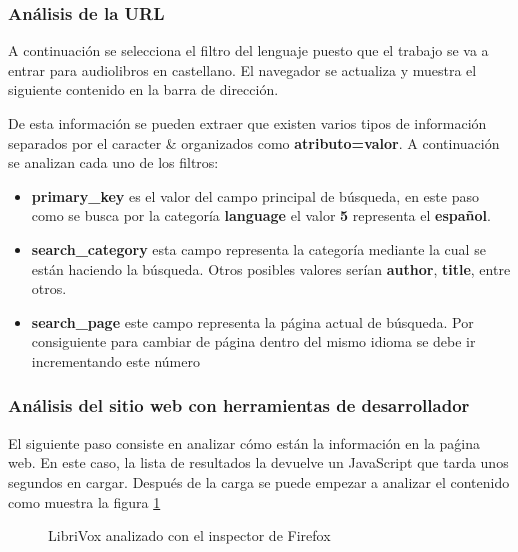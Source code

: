 \subsubsection{Análisis de la \acrshort{URL}}
A continuación se selecciona el filtro del lenguaje puesto que el trabajo se va a entrar para audiolibros en castellano. El navegador se actualiza y muestra el siguiente contenido en la barra de dirección.
\begin{center}
\end{center}
De esta información se pueden extraer que existen varios tipos de información separados por el caracter \& organizados como \textbf{atributo=valor}. A continuación se analizan cada uno de los filtros:
\begin{itemize}
	\item \textbf{primary\_key} es el valor del campo principal de búsqueda, en este paso como se busca por la categoría \textbf{language} el valor \textbf{5} representa el \textbf{español}.
	\item \textbf{search\_category} esta campo representa la categoría mediante la cual se están haciendo la búsqueda. Otros posibles valores serían \textbf{author}, \textbf{title}, entre otros.
	\item \textbf{search\_page} este campo representa la página actual de búsqueda. Por consiguiente para cambiar de página dentro del mismo idioma se debe ir incrementando este número
\end{itemize}
\subsubsection{Análisis del sitio web con herramientas de desarrollador}
El siguiente paso consiste en analizar cómo están la información en la paǵina web. En este caso, la lista de resultados la devuelve un JavaScript que tarda unos segundos en cargar. Después de la carga se puede empezar a analizar el contenido como muestra la figura \ref{fig: librivox_inspect}
\begin{figure}[ht!]
	\centering
	\caption{LibriVox analizado con el inspector de Firefox}
	\label{fig: librivox_inspect}
\end{figure}

